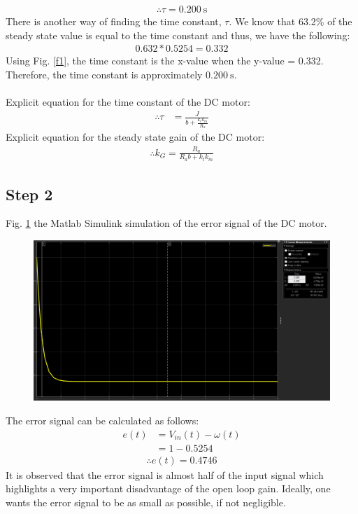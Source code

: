 \documentclass[hidelinks]{article}
\begin{document}
	\begin{align*}
		\therefore \tau = \SI{0.200}{\second}
	\end{align*}
	There is another way of finding the time constant, $\tau$.
	We know that 63.2\% of the steady state value is equal to the time constant and thus, we have the following:
	\begin{align*}
		0.632 * 0.5254 = 0.332
	\end{align*}
	Using Fig. \ref{f1}, the time constant is the x-value when the y-value = 0.332.
	Therefore, the time constant is approximately $\SI{0.200}{\second}$.\\\\
	Explicit equation for the time constant of the DC motor:
	\begin{align}
	\label{tc}
		\therefore \tau &= \frac{J}{b + \frac{k_t k_m}{R_a}}
	\end{align}
	Explicit equation for the steady state gain of the DC motor:
	\begin{align}
	\label{gain}
		\therefore k_G = \frac{R_a}{R_a b + k_t k_m}
	\end{align}
	
	\pagebreak
	\subsection{Step 2}
	Fig. \ref{f2} the Matlab Simulink simulation of the error signal of the DC motor.
	\begin{figure}[htbp]
		\centering
		\includegraphics[width=0.7\textheight]{1_step2.1.png}
		\label{f2}
	\end{figure}

	\noindent The error signal can be calculated as follows:
	\begin{align}
		e(t) &= V_{in}(t) - \omega(t)\\
		&= 1 - 0.5254\nonumber
	\end{align}
	\begin{align*}
		\therefore e(t) = 0.4746
	\end{align*}
	\noindent It is observed that the error signal is almost half of the input signal which highlights a very important disadvantage of the open loop gain.
	Ideally, one wants the error signal to be as small as possible, if not negligible.
	
\end{document}
